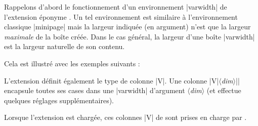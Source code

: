 \documentclass[dvipsnames]{article}%
\begin{document}
Rappelons d'abord le fonctionnement d'un environnement |{varwidth}| de
l'extension éponyme . Un tel environnement est similaire à
l'environnement classique |{minipage}| mais la largeur indiquée (en argument)
n'est que la largeur \emph{maximale} de la boîte créée. Dans le cas général, la
largeur d'une boîte |{varwidth}| est la largeur naturelle de son contenu.

\smallskip
Cela est illustré avec les exemples suivants :

\medskip
\begin{Code}[width=6cm]
\end{Code}

\bigskip
\begin{Code}[width=6cm]
\end{Code}

\bigskip
L'extension  définit également le type de colonne |V|. Une colonne
|V{|$\langle$\textsl{dim}$\rangle$|}| encapsule toutes ses cases dans une
|{varwidth}| d'argument $\langle$\textsl{dim}$\rangle$ (et effectue quelques
réglages supplémentaires).

\medskip
Lorsque l'extension  est chargée, ces colonnes |V| de
 sont prises en charge par . 
\end{document}

